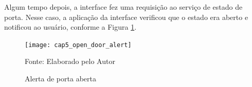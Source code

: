 Algum tempo depois, a interface fez uma requisição ao serviço de estado de porta. Nesse caso, a aplicação da interface verificou que o estado era aberto e notificou ao usuário, conforme a Figura \ref{fig:cap5_open_door_alert}.


\begin{figure}[H]
    \caption{Alerta de porta aberta}
    \label{fig:cap5_open_door_alert}
    \texttt{[image: cap5\_open\_door\_alert]}
    
    \footnotesize{Fonte: Elaborado pelo Autor}
\end{figure}




